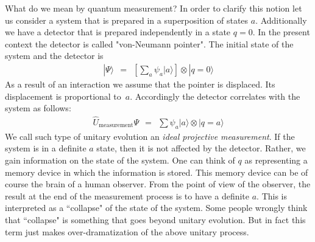 \documentclass[onecolumn,fleqn]{revtex4}
\newcommand{\tbox}[1]{\text{#1}}
\newcommand{\beq}{\begin{eqnarray}}
\newcommand{\eeq}{\end{eqnarray}}
\begin{document}
What do we mean by quantum measurement? In order to 
clarify this notion let us consider a system that is prepared 
in a superposition of states $a$. Additionally we have 
a detector that is prepared  independently in a state $q{=}0$. 
In the present context the detector is called "von-Neumann pointer". 
The initial state of the system and the detector is  
\beq
|\Psi\rangle \ \ = \ \ \left[ \sum_a \psi_a |a\rangle \right] \otimes | q=0 \rangle 
\eeq
As a result of an interaction we assume that 
the pointer is displaced. Its displacement 
is proportional to~$a$. Accordingly the  
detector correlates with the system as follows:
\beq
\hat{U}_{\tbox{measurement}}\Psi \ \ = \ \ \sum\psi_a |a\rangle  \otimes  | q=a \rangle 
\eeq
We call such type of unitary evolution an {\em ideal projective measurement}. 
If the system is in a definite $a$ state, then it is not 
affected by the detector. Rather, we gain information on 
the state of the system. One can think of $q$ as representing 
a memory device in which the information is stored.
This memory device can be of course the brain of a human 
observer. From the point of view of the observer, 
the result at the end of the measurement process 
is to have a definite $a$.  This is interpreted 
as a ``collapse" of the state of the system. Some people 
wrongly think that ``collapse" is something that goes 
beyond unitary evolution. But in fact this term just 
makes over-dramatization of the above unitary process. 
    
\end{document}
